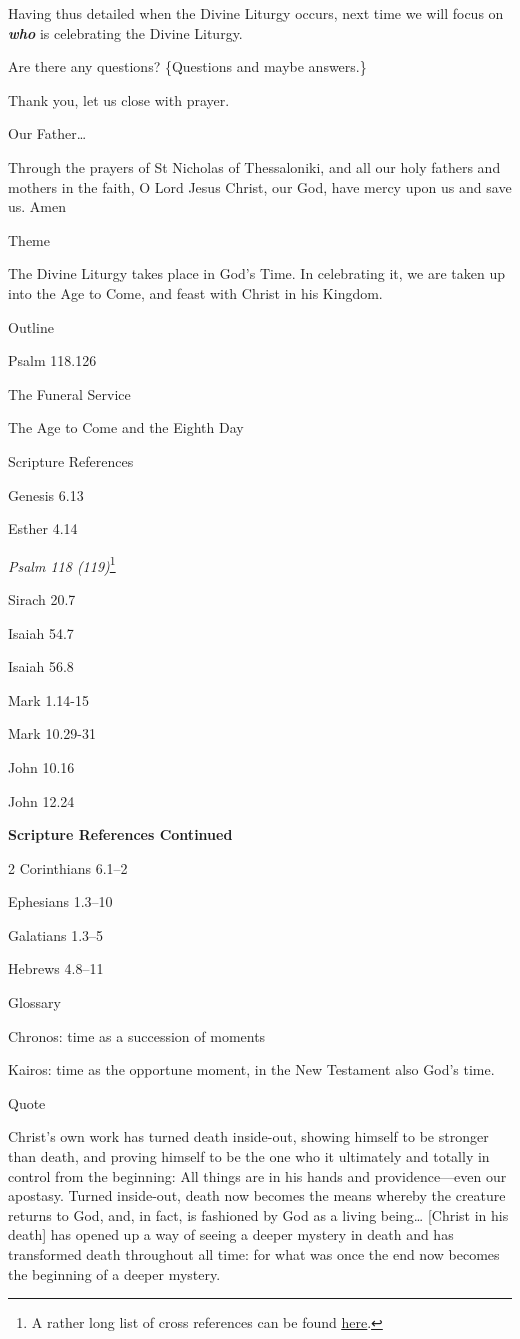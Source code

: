 \documentclass[
]{article}
\newcommand{\RL}[1]{\beginR #1\endR}
\begin{document}
Having thus detailed when the Divine Liturgy occurs, next time we will
focus on \textbf{\emph{who}} is celebrating the Divine Liturgy.

Are there any questions? \{Questions and maybe answers.\}

Thank you, let us close with prayer.

Our Father\ldots{}

Through the prayers of St Nicholas of Thessaloniki, and all our holy
fathers and mothers in the faith, O Lord Jesus Christ, our God, have
mercy upon us and save us. Amen

Theme

The Divine Liturgy takes place in God's Time. In celebrating it, we are
taken up into the Age to Come, and feast with Christ in his Kingdom.

Outline

Psalm 118.126

The Funeral Service

The Age to Come and the Eighth Day

Scripture References

Genesis 6.13

Esther 4.14

\emph{Psalm 118 (119)}\footnote{A rather long list of cross references
  can be found
  \href{http://jimmyakin.com/deuterocanonical-references-in-the-new-testament}{\ul{here}}.}

Sirach 20.7

Isaiah 54.7

Isaiah 56.8

Mark 1.14-15

Mark 10.29-31

John 10.16

John 12.24

\textbf{Scripture References Continued}

2 Corinthians 6.1--2

Ephesians 1.3--10

Galatians 1.3--5

Hebrews 4.8--11

Glossary

Chronos: time as a succession of moments

Kairos: time as the opportune moment, in the New Testament also God's
time.

Quote

Christ\RL{'}s own work has turned death inside-out, showing himself to
be stronger than death, and proving himself to be the one who it
ultimately and totally in control from the beginning: All things are in
his hands and providence---even our apostasy. Turned inside-out, death
now becomes the means whereby the creature returns to God, and, in fact,
is fashioned by God as a living being\ldots{} {[}Christ in his death{]}
has opened up a way of seeing a deeper mystery in death and has
transformed death throughout all time: for what was once the end now
becomes the beginning of a deeper mystery.
\end{document}

